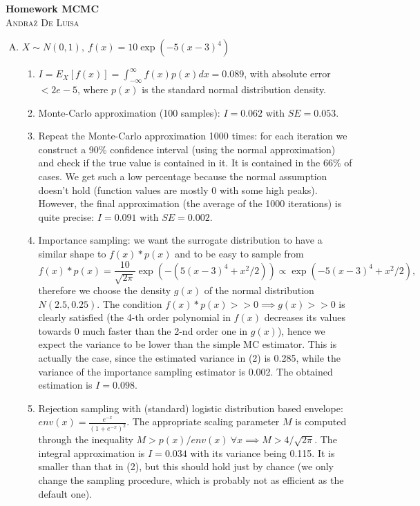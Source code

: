 \documentclass[12pt]{article}
\begin{document}
\begin{center}

\Huge{\textbf{Homework MCMC}} \\
\textsc{\Large{Andraž De Luisa}} \\

\end{center}

\begin{enumerate}[A)]

    \item $X \sim N(0, 1), ~ f(x) = 10 \exp{(-5 (x-3)^4)}$
        \begin{enumerate}[1.]
            \item $I = E_X[f(x)] = \int_{-\infty}^{\infty} f(x) p(x) dx = 0.089$, with absolute error $< 2e-5$, where $p(x)$ is the standard normal distribution density.
            \item Monte-Carlo approximation (100 samples): $I = 0.062$ with $SE = 0.053$.
            \item Repeat the Monte-Carlo approximation 1000 times: for each iteration we construct a 90\% confidence interval (using the normal approximation) and check if the true value is contained in it. It is contained in the 66\% of cases. We get such a low percentage because the normal assumption doesn't hold (function values are mostly 0 with some high peaks). However, the final approximation (the average of the 1000 iterations) is quite precise: $I = 0.091$ with $SE = 0.002$.
            \item Importance sampling: we want the surrogate distribution to have a similar shape to $f(x) * p(x)$ and to be easy to sample from
            $$ f(x) * p(x) = \frac{10}{\sqrt{2 \pi}} \exp(-(5(x-3)^4 + x^2/2)) \propto \exp(-5(x-3)^4 + x^2/2), $$
            therefore we choose the density $g(x)$ of the normal distribution $N(2.5, 0.25)$. The condition $ f(x) * p(x) >> 0 \implies g(x) >> 0$ is clearly satisfied (the 4-th order polynomial in $f(x)$ decreases its values towards 0 much faster than the 2-nd order one in $g(x)$), hence we expect the variance to be lower than the simple MC estimator. This is actually the case, since the estimated variance in (2) is 0.285, while the variance of the importance sampling estimator is 0.002. The obtained estimation is $I = 0.098$.
            \item Rejection sampling with (standard) logistic distribution based envelope: $ env(x) = \frac{e^{-x}}{(1 + e^{-x})^2}$. The appropriate scaling parameter $M$ is computed through the inequality $M > p(x) / env(x) ~ \forall x \implies M > 4 / \sqrt{2 \pi}$. The integral approximation is $I = 0.034$ with its variance being 0.115. It is smaller than that in (2), but this should hold just by chance (we only change the sampling procedure, which is probably not as efficient as the default one).

\end{enumerate}
\end{enumerate}
\end{document}
